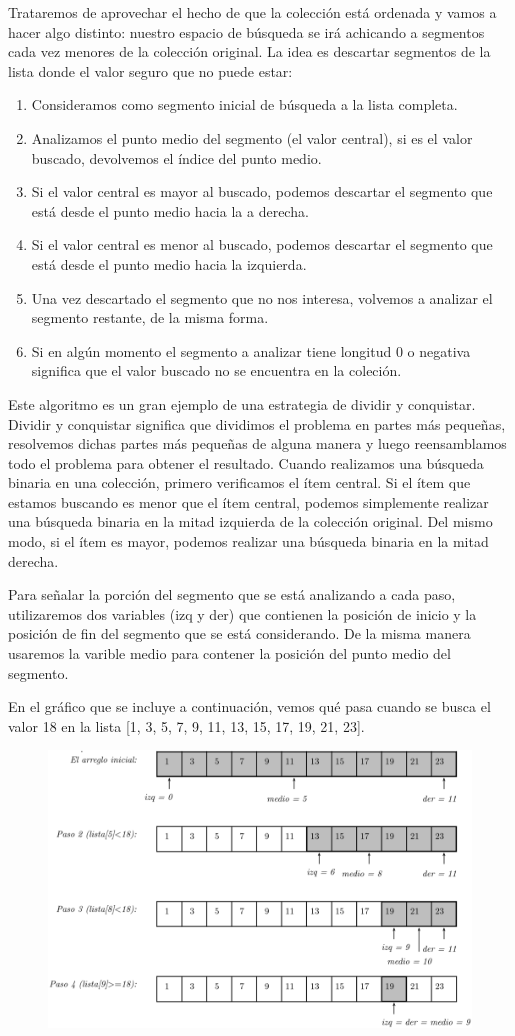 Trataremos de aprovechar el hecho de que la colección está ordenada y vamos a hacer algo distinto: nuestro espacio de búsqueda se irá achicando a segmentos cada vez menores de la colección original. La idea es descartar segmentos de la lista donde el valor seguro que no puede estar:

\begin{enumerate}
	\item Consideramos como segmento inicial de búsqueda a la lista completa.
	\item Analizamos el punto medio del segmento (el valor central), si es el valor buscado, devolvemos el índice del punto medio.
	\item Si el valor central es mayor al buscado, podemos descartar el segmento que está desde el punto medio hacia la a derecha.
	\item Si el valor central es menor al buscado, podemos descartar el segmento que está desde el punto medio hacia la izquierda.
	\item Una vez descartado el segmento que no nos interesa, volvemos a analizar el segmento restante, de la misma forma.
	\item Si en algún momento el segmento a analizar tiene longitud 0 o negativa significa que el valor buscado no se encuentra en la coleción.
\end{enumerate}

Este algoritmo es un gran ejemplo de una estrategia de dividir y conquistar. Dividir y conquistar 
significa que dividimos el problema en partes más pequeñas, resolvemos dichas partes más pequeñas de 
alguna manera y luego reensamblamos todo el problema para obtener el resultado. Cuando realizamos una 
búsqueda binaria en una colección, primero verificamos el ítem central. Si el ítem que estamos 
buscando es menor que el ítem central, podemos simplemente realizar una búsqueda binaria en la mitad 
izquierda de la colección original. Del mismo modo, si el ítem es mayor, podemos realizar una 
búsqueda binaria en la mitad derecha. 

Para señalar la porción del segmento que se está analizando a cada paso, utilizaremos dos variables (izq y der) que contienen la posición de inicio y la posición de fin del segmento que se está considerando. De la misma manera usaremos la varible medio para contener la posición del punto medio del segmento.

En el gráfico que se incluye a continuación, vemos qué pasa cuando se busca el valor 18 en la lista [1, 3, 5, 7, 9, 11, 13, 15, 17, 19, 21, 23].

\begin{figure}[h!]
	\centering
	\includegraphics[width=0.7\linewidth]{img/f0801}


\end{figure}

